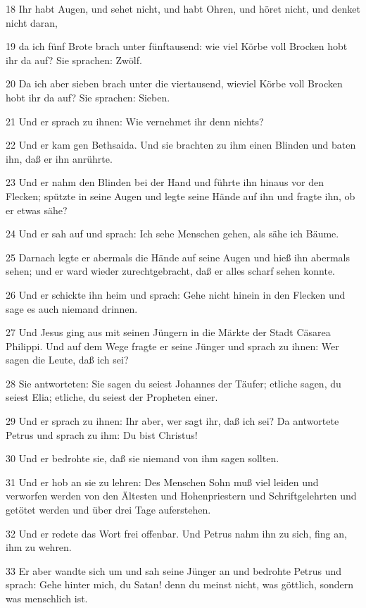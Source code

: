 \par 18 Ihr habt Augen, und sehet nicht, und habt Ohren, und höret nicht, und denket nicht daran,
\par 19 da ich fünf Brote brach unter fünftausend: wie viel Körbe voll Brocken hobt ihr da auf? Sie sprachen: Zwölf.
\par 20 Da ich aber sieben brach unter die viertausend, wieviel Körbe voll Brocken hobt ihr da auf? Sie sprachen: Sieben.
\par 21 Und er sprach zu ihnen: Wie vernehmet ihr denn nichts?
\par 22 Und er kam gen Bethsaida. Und sie brachten zu ihm einen Blinden und baten ihn, daß er ihn anrührte.
\par 23 Und er nahm den Blinden bei der Hand und führte ihn hinaus vor den Flecken; spützte in seine Augen und legte seine Hände auf ihn und fragte ihn, ob er etwas sähe?
\par 24 Und er sah auf und sprach: Ich sehe Menschen gehen, als sähe ich Bäume.
\par 25 Darnach legte er abermals die Hände auf seine Augen und hieß ihn abermals sehen; und er ward wieder zurechtgebracht, daß er alles scharf sehen konnte.
\par 26 Und er schickte ihn heim und sprach: Gehe nicht hinein in den Flecken und sage es auch niemand drinnen.
\par 27 Und Jesus ging aus mit seinen Jüngern in die Märkte der Stadt Cäsarea Philippi. Und auf dem Wege fragte er seine Jünger und sprach zu ihnen: Wer sagen die Leute, daß ich sei?
\par 28 Sie antworteten: Sie sagen du seiest Johannes der Täufer; etliche sagen, du seiest Elia; etliche, du seiest der Propheten einer.
\par 29 Und er sprach zu ihnen: Ihr aber, wer sagt ihr, daß ich sei? Da antwortete Petrus und sprach zu ihm: Du bist Christus!
\par 30 Und er bedrohte sie, daß sie niemand von ihm sagen sollten.
\par 31 Und er hob an sie zu lehren: Des Menschen Sohn muß viel leiden und verworfen werden von den Ältesten und Hohenpriestern und Schriftgelehrten und getötet werden und über drei Tage auferstehen.
\par 32 Und er redete das Wort frei offenbar. Und Petrus nahm ihn zu sich, fing an, ihm zu wehren.
\par 33 Er aber wandte sich um und sah seine Jünger an und bedrohte Petrus und sprach: Gehe hinter mich, du Satan! denn du meinst nicht, was göttlich, sondern was menschlich ist.
